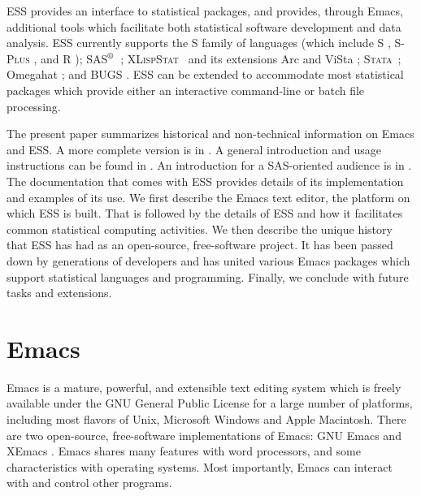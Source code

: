 \documentclass{article}
\newcommand*{\SAS}{\textsc{SAS}$^{\mbox{\scriptsize\textregistered}}$}
\newcommand*{\Splus}{\textsc{S-Plus}}
\newcommand*{\XLispStat}{\textsc{XLispStat}}
\newcommand*{\Stata}{\textsc{Stata}}
\begin{document}
ESS provides an interface to statistical packages, and provides,
through Emacs, additional tools which facilitate both statistical
software development and data analysis.  ESS currently supports
the S family of languages (which include
S \citep{BecRCW88,ChaJH92,ChaJ98}, \Splus{} \citep{Splus}, and R
\citep{ihak:gent:1996}); \SAS\ \citep{SAS:8}; \XLispStat\
\citep{Tier90} and its extensions Arc \citep{Cook:Weisberg:1999} and
ViSta \citep{youn:fald:mcfa:1992}; \Stata\ \citep{Stata:6.0}; Omegahat
\citep{DTLang:2000}; and BUGS \citep{BUGS}.  ESS can be
extended to accommodate most statistical packages which provide either
an interactive command-line or batch file processing.

The present paper summarizes historical and non-technical information on
Emacs and ESS.  A more complete version is in \citep{RMHHS:2001}.
A general introduction and usage instructions can be
found in \citep{heiberger:dsc:2001}.
An introduction for a SAS-oriented audience is in
\citep{heiberger:philasugi:2001}.  The documentation that comes with
ESS provides details of its implementation and examples of its use.
We first describe the Emacs text editor, the platform on which ESS is
built.  That is followed by the details of ESS and how it facilitates
common statistical computing activities.  We then describe the unique
history that ESS has had as an open-source, free-software project.
It has been passed down by generations of developers and has
united various Emacs packages which support
statistical languages and programming.  Finally, we conclude with
future tasks and extensions.

\section{Emacs}
\label{sec:emacs}

Emacs is a mature, powerful, and extensible text editing system which
is freely available under the GNU General Public License for a large
number of platforms, including most flavors of Unix, Microsoft Windows
and Apple Macintosh.  There are two open-source, free-software
implementations of Emacs:  GNU Emacs \citep{GNU-Emacs} and XEmacs
\citep{XEmacs}.  Emacs shares many features with
word processors, and some characteristics with operating systems.
Most importantly, Emacs can interact with and control other programs.
\end{document}
